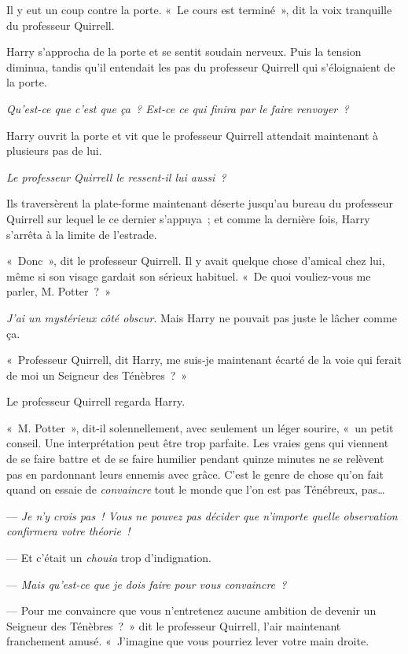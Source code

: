 Il y eut un coup contre la porte. «~Le cours est terminé~», dit la voix tranquille du professeur Quirrell.

Harry s'approcha de la porte et se sentit soudain nerveux. Puis la tension diminua, tandis qu'il entendait les pas du professeur Quirrell qui s'éloignaient de la porte.

\emph{Qu'est-ce que c'est que ça~? Est-ce ce qui finira par le faire renvoyer~?}

Harry ouvrit la porte et vit que le professeur Quirrell attendait maintenant à plusieurs pas de lui.

\emph{Le professeur Quirrell le ressent-il lui aussi~?}

Ils traversèrent la plate-forme maintenant déserte jusqu'au bureau du professeur Quirrell sur lequel le ce dernier s'appuya~; et comme la dernière fois, Harry s'arrêta à la limite de l'estrade.

«~Donc~», dit le professeur Quirrell. Il y avait quelque chose d'amical chez lui, même si son visage gardait son sérieux habituel. «~De quoi vouliez-vous me parler, M. Potter~?~»

\emph{J'ai un mystérieux côté obscur}. Mais Harry ne pouvait pas juste le lâcher comme ça.

«~Professeur Quirrell, dit Harry, me suis-je maintenant écarté de la voie qui ferait de moi un Seigneur des Ténèbres~?~»

Le professeur Quirrell regarda Harry.

«~M. Potter~», dit-il solennellement, avec seulement un léger sourire, «~un petit conseil. Une interprétation peut être trop parfaite. Les vraies gens qui viennent de se faire battre et de se faire humilier pendant quinze minutes ne se relèvent pas en pardonnant leurs ennemis avec grâce. C'est le genre de chose qu'on fait quand on essaie de \emph{convaincre} tout le monde que l'on est pas Ténébreux, pas…

--- \emph{Je n'y crois pas~! Vous ne pouvez pas décider que n'importe quelle observation confirmera votre théorie~!}

--- Et c'était un \emph{chouia} trop d'indignation.

--- \emph{Mais qu'est-ce que je dois faire pour vous convaincre~?}

--- Pour me convaincre que vous n'entretenez aucune ambition de devenir un Seigneur des Ténèbres~?~» dit le professeur Quirrell, l'air maintenant franchement amusé. «~J'imagine que vous pourriez lever votre main droite.


